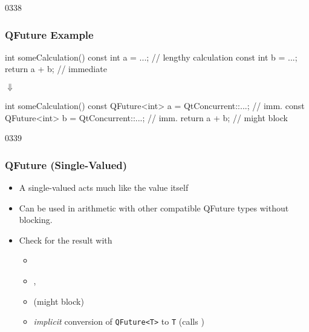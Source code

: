 \begin{slide}[fragile]{0338}
\frametitle{QFuture Example}
\begin{center}
\begin{cpp}
int someCalculation() {
  const int a = ...; // lengthy calculation
  const int b = ...;
  return a + b; // immediate
}
\end{cpp}
{\Huge$\Downarrow$}
\begin{cpp}
int someCalculation() {
  const QFuture<int> a = QtConcurrent::...; // imm.
  const QFuture<int> b = QtConcurrent::...; // imm.
  return a + b; // might block
}
\end{cpp}
\end{center}
\end{slide}
\begin{slide}{0339}
\frametitle{QFuture (Single-Valued)}
  \begin{itemize}
  \item A single-valued  acts much like the value itself
  \item Can be used in arithmetic with other compatible QFuture types without blocking.
  \item Check for the result with
    \begin{itemize}
    \item {}
    \item {},
    \item {} (might block)
    \item \emph{implicit} conversion of \texttt{QFuture<T>} to \texttt{T} (calls )
    \end{itemize}
  \end{itemize}
\end{slide}
